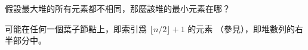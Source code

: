 \startEXERCISE
假設最大堆的所有元素都不相同，那麼該堆的最小元素在哪？
\stopEXERCISE

\startANSWER
可能在任何一個葉子節點上，即索引爲 $\lfloor n/2 \rfloor + 1$ 的元素
（參見），即堆數列的右半部分中。
\stopANSWER
